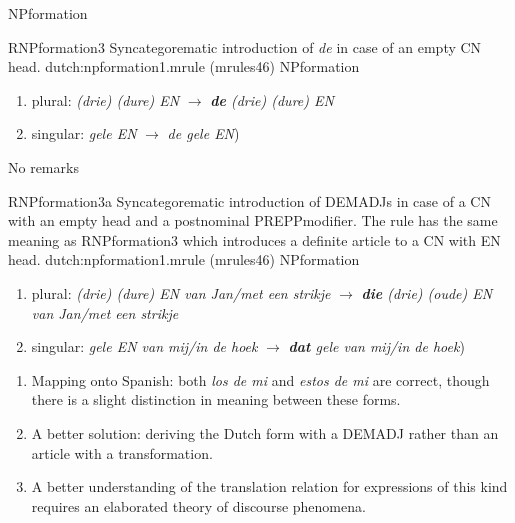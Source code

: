 \begin{mruleclass}{NPformation}
\begin{members}
\begin{member}
\end{member}
\begin{member}
 RNPformation3
Syncategorematic introduction of {\em de} in case of an empty CN head.
\file dutch:npformation1.mrule (mrules46)
\semantics NPformation
\example 
\begin{enumerate} 
  \item
plural: {\em (drie) (dure) EN} $\rightarrow$ 
{\em {\bf de} (drie) (dure) EN}
\item 
 singular: {\em  gele EN} $\rightarrow$ 
{\em de gele EN})
\end{enumerate}
\remarks No remarks
\end{member}
\begin{member}
 RNPformation3a
Syncategorematic introduction of DEMADJs 
in case of a CN with an empty head and 
a postnominal PREPPmodifier. 
The rule has the same meaning as RNPformation3 which 
introduces a definite article to a CN with EN head.
\file dutch:npformation1.mrule (mrules46)
\semantics NPformation
\example 
\begin{enumerate}
  \item 
plural: {\em (drie) (dure) EN van Jan/met een strikje } 
$\rightarrow$ 
{\em {\bf die} (drie) (oude) EN van Jan/met een strikje} 
\item
singular: {\em gele EN van mij/in de hoek} $\rightarrow$ 
 {\em {\bf dat} gele van 
mij/in de hoek})
\end{enumerate}
\remarks\mbox{}
\begin{enumerate}
\item 
Mapping onto Spanish:
both {\em los de mi} and {\em estos de mi} are correct, though there is a 
slight distinction in meaning between these forms.
\item A better solution: deriving the Dutch form with a DEMADJ rather than 
an article with a transformation. 
\item A better understanding of the translation relation for expressions of 
this kind requires an elaborated theory of discourse phenomena.
\end{enumerate}


\end{member}
\end{members}
\end{mruleclass}
